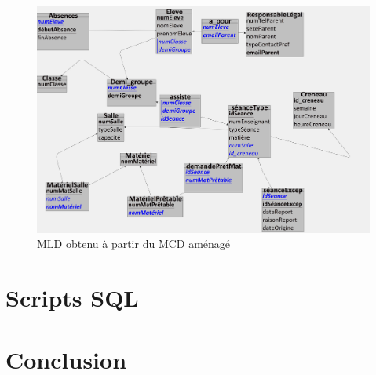 \documentclass[12pt,french,titlepage]{article}
\begin{document}
	  \begin{figure}[H]
	      \centering
	      \includegraphics[scale=0.08]{./mld_amenage.jpg}
	      \caption{MLD obtenu à partir du MCD aménagé}
	      
	   
	      
	  \end{figure}
	  
	  \section{Scripts SQL}
	  
	  
	  
	  \section{Conclusion}
    

	
	
	
\end{document}
